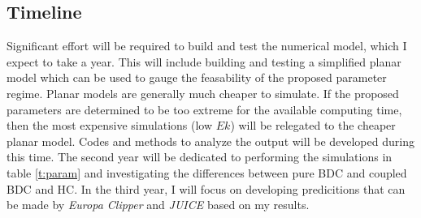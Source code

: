 \documentclass[12pt]{article}
\begin{document}
 \subsection{Timeline}
 Significant effort will be required to build and test the numerical model, which I expect to take a year. This will include building and testing a simplified planar model which can be used to gauge the feasability of the proposed parameter regime. Planar models are generally much cheaper to simulate. If the proposed parameters are determined to be too extreme for the available computing time, then the most expensive simulations (low $Ek$) will be relegated to the cheaper planar model. Codes and methods to analyze the output will be developed during this time. The second year will be dedicated to performing the simulations in table \ref{t:param} and investigating the differences between pure BDC and coupled BDC and HC. In the third year, I will focus on developing predicitions that can be made by \textit{Europa Clipper} and \textit{JUICE} based on my results.%

\end{document}
